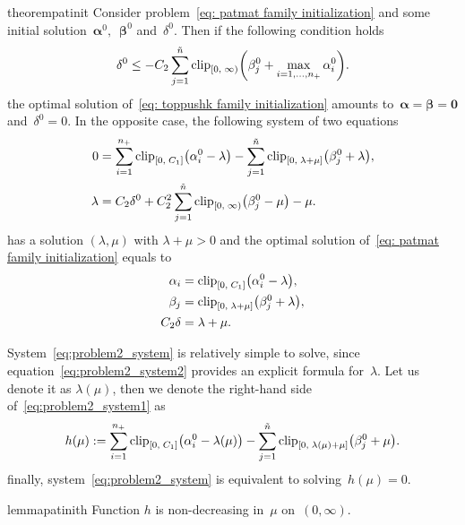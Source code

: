 \begin{restatable}{theorem}{patinit}\label{thm:problem2}
  Consider problem~\eqref{eq: patmat family initialization} and some initial solution~$\bm{\alpha}^0,$~$\bm{\beta}^0$ and~$\delta^0.$ Then if the following condition holds
  \begin{equation}\label{eq:problem2_cond}
    \delta^0 \le - C_2 \sum_{j = 1}^{\ntil} \clip[u]{0}{\infty}{\beta_j^0 + \max_{i=1,\dots,\npos} \alpha_i^0}.
  \end{equation}
  the optimal solution of~\eqref{eq: toppushk family initialization} amounts to~$\bm{\alpha} = \bm{\beta} = \bm{0}$ and~$\delta^0 = 0.$ In the opposite case, the following system of two equations
  \begin{subequations}\label{eq:problem2_system}
    \begin{align}
    0
      & = \sum_{i=1}^{\npos} \clip{0}{C_1}{\alpha_i^0 - \lambda} - \sum_{j=1}^{\ntil} \clip{0}{\lambda + \mu}{\beta_j^0 + \lambda},
    \label{eq:problem2_system1} \\
    \lambda
      & = C_2 \delta^0 + C_2^2 \sum_{j=1}^{\ntil} \clip[u]{0}{\infty}{\beta_j^0 - \mu} - \mu.
    \label{eq:problem2_system2}
    \end{align}
  \end{subequations}
  has a solution $(\lambda,\mu)$ with $\lambda+\mu>0$ and the optimal solution of~\eqref{eq: patmat family initialization} equals to
  \begin{align*}
    \alpha_i & = \clip{0}{C_1}{\alpha_i^0 - \lambda}, \\
    \beta_j & = \clip{0}{\lambda + \mu}{\beta_j^0 + \lambda}, \\
    C_2 \delta &= \lambda + \mu.
  \end{align*}
\end{restatable}

System~\eqref{eq:problem2_system} is relatively simple to solve, since equation~\eqref{eq:problem2_system2} provides an explicit formula for~$\lambda$. Let us denote it as $\lambda(\mu)$, then we denote the right-hand side of~\eqref{eq:problem2_system1} as
\begin{equation}\label{eq:defin_f2}
  h(\mu) :=
    \sum_{i=1}^{\npos} \clip{0}{C_1}{\alpha_i^0 - \lambda(\mu)} - \sum_{j=1}^{\ntil} \clip{0}{\lambda(\mu) + \mu}{\beta_j^0 + \mu}.
\end{equation}
finally, system~\eqref{eq:problem2_system} is equivalent to solving~$h(\mu) = 0$.

\begin{restatable}{lemma}{patinith}\label{lemma:problem2}
  Function $h$ is non-decreasing in~$\mu$ on~$(0,\infty)$.
\end{restatable}

